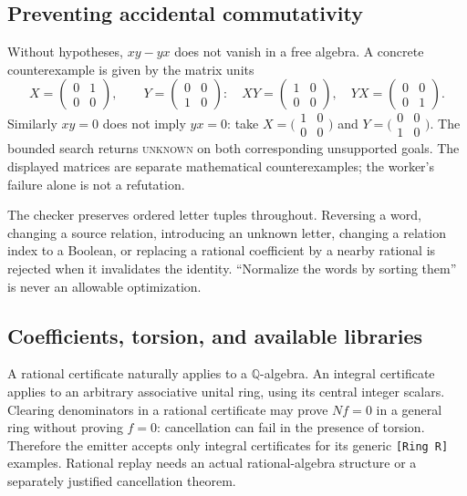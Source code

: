 \documentclass[11pt,letterpaper]{article}
\newcommand{\Q}{\mathbb Q}\newcommand{\R}{\mathbb R}\newcommand{\N}{\mathbb N}
\newcommand{\code}[1]{\texttt{#1}}
\newcommand{\unknown}{\textsc{unknown}}
\theoremstyle{definition}\newtheorem{definition}[theorem]{Definition}
\theoremstyle{remark}\newtheorem{remark}[theorem]{Remark}
\begin{document}
\subsection{Preventing accidental commutativity}
Without hypotheses, $xy-yx$ does not vanish in a free algebra. A concrete
counterexample is given by the matrix units
\[
 X=\begin{pmatrix}0&1\\0&0\end{pmatrix},\qquad
 Y=\begin{pmatrix}0&0\\1&0\end{pmatrix}:
 \quad XY=\begin{pmatrix}1&0\\0&0\end{pmatrix},\quad
 YX=\begin{pmatrix}0&0\\0&1\end{pmatrix}.
\]
Similarly $xy=0$ does not imply $yx=0$: take
$X=\bigl(\begin{smallmatrix}1&0\\0&0\end{smallmatrix}\bigr)$ and
$Y=\bigl(\begin{smallmatrix}0&0\\1&0\end{smallmatrix}\bigr)$.
The bounded search returns \unknown{} on both corresponding unsupported goals.
The displayed matrices are separate mathematical counterexamples; the
worker's failure alone is not a refutation.

The checker preserves ordered letter tuples throughout. Reversing a word,
changing a source relation, introducing an unknown letter, changing a relation
index to a Boolean, or replacing a rational coefficient by a nearby rational
is rejected when it invalidates the identity. ``Normalize the words by sorting
them'' is never an allowable optimization.

\subsection{Coefficients, torsion, and available libraries}
A rational certificate naturally applies to a $\Q$-algebra. An integral
certificate applies to an arbitrary associative unital ring, using its central
integer scalars. Clearing denominators in a rational certificate may prove
$Nf=0$ in a general ring without proving $f=0$: cancellation can fail in the
presence of torsion. Therefore the emitter accepts only integral certificates
for its generic \code{[Ring R]} examples. Rational replay needs an actual
rational-algebra structure or a separately justified cancellation theorem.
\end{document}
